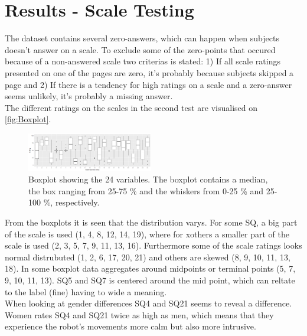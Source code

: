 \section{Results - Scale Testing}
\label{ResultsScaleTesting}
%
The dataset contains several zero-answers, which can happen when subjects doesn't answer on a scale. To exclude some of the zero-points that occured because of a non-answered scale two criterias is stated: 1) If all scale ratings presented on one of the pages are zero, it's probably because subjects skipped a page and 2) If there is a tendency for high ratings on a scale and a zero-answer seems unlikely, it's probably a missing answer.\\

\noindent
The different ratings on the scales in the second test are visualised on \autoref{fig:Boxplot}.
%
\begin{figure}[H]
	\centering
	\includegraphics[width = 0.49\textwidth]{Figure/Boksplot24uden0}
	\setlength{} 
	\caption{Boxplot showing the 24 variables. The boxplot contains a median, the box ranging from 25-75 \% and the whiskers from 0-25 \% and 25-100 \%, respectively.}
	\label{fig:Boxplot}
\end{figure}
\noindent
%
From the boxplots it is seen that the distribution varys. For some SQ, a big part of the scale is used (1, 4, 8, 12, 14, 19), where for xothers a smaller part of the scale is used (2, 3, 5, 7, 9, 11, 13, 16). Furthermore some of the scale ratings looks normal distrubuted (1, 2, 6, 17, 20, 21) and others are skewed (8, 9, 10, 11, 13, 18). In some boxplot data aggregates around midpoints or terminal points (5, 7, 9, 10, 11, 13). SQ5 and SQ7 is centered around the mid point, which can reltate to the label (fine) having to wide a meaning. \\ 

\noindent
When looking at gender differences SQ4 and SQ21 seems to reveal a difference. Women rates SQ4 and SQ21 twice as high as men, which means that they experience the robot's movements more calm but also more intrusive.\\

